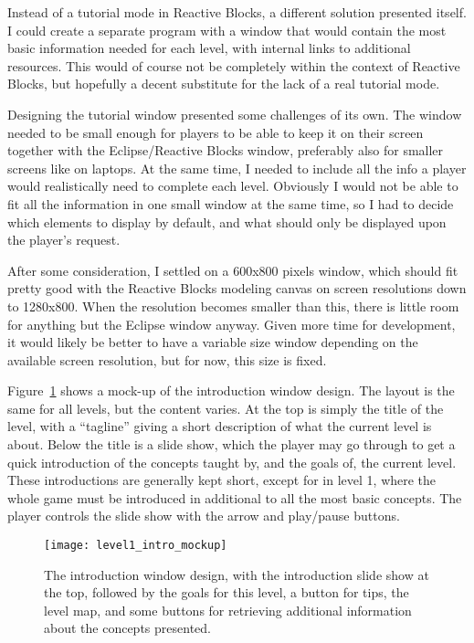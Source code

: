 \noindent
Instead of a tutorial mode in Reactive Blocks, a different solution presented itself. I could create a separate program with a window that would contain the most basic information needed for each level, with internal links to additional resources. This would of course not be completely within the context of Reactive Blocks, but hopefully a decent substitute for the lack of a real tutorial mode.

\noindent
Designing the tutorial window presented some challenges of its own. The window needed to be small enough for players to be able to keep it on their screen together with the Eclipse/Reactive Blocks window, preferably also for smaller screens like on laptops. At the same time, I needed to include all the info a player would realistically need to complete each level. Obviously I would not be able to fit all the information in one small window at the same time, so I had to decide which elements to display by default, and what should only be displayed upon the player's request.

\noindent
After some consideration, I settled on a 600x800 pixels window, which should fit pretty good with the Reactive Blocks modeling canvas on screen resolutions down to 1280x800. When the resolution becomes smaller than this, there is little room for anything but the Eclipse window anyway. Given more time for development, it would likely be better to have a variable size window depending on the available screen resolution, but for now, this size is fixed.

\noindent
Figure~\ref{fig:level1_intro_mockup} shows a mock-up of the introduction window design. The layout is the same for all levels, but the content varies. At the top is simply the title of the level, with a ``tagline'' giving a short description of what the current level is about. Below the title is a slide show, which the player may go through to get a quick introduction of the concepts taught by, and the goals of, the current level. These introductions are generally kept short, except for in level 1, where the whole game must be introduced in additional to all the most basic concepts. The player controls the slide show with the arrow and play/pause buttons.

\begin{figure}[htp]
	\centering
	\texttt{[image: level1\_intro\_mockup]}
	\caption[Introduction window mock-up]{The introduction window design, with the introduction slide show at the top, followed by the goals for this level, a button for tips, the level map, and some buttons for retrieving additional information about the concepts presented.}
	\label{fig:level1_intro_mockup}
\end{figure}

